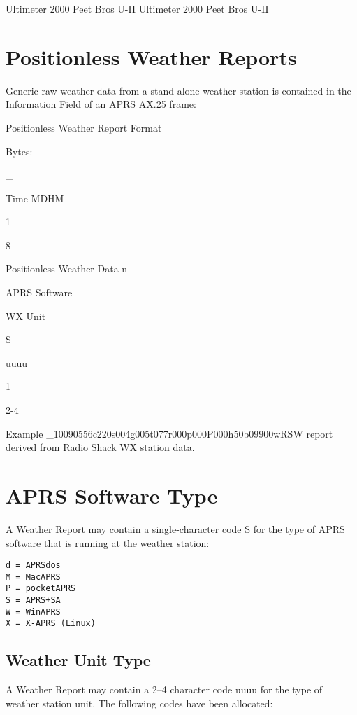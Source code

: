 Ultimeter 2000
Peet Bros U-II
Ultimeter 2000
Peet Bros U-II


\section{Positionless Weather Reports}

Generic raw weather data from a stand-alone weather station is contained in
the Information Field of an APRS AX.25 frame:

Positionless Weather Report Format

Bytes:

_

Time
MDHM

1

8

Positionless Weather
Data
n

APRS
Software

WX
Unit

S

uuuu

1

2-4

Example
_10090556c220s004g005t077r000p000P000h50b09900wRSW
report derived from Radio Shack WX station data.

\section {APRS Software Type}

A Weather Report may contain a single-character code S for the type of
APRS software that is running at the weather station:


\begin{verbatim}
d = APRSdos
M = MacAPRS
P = pocketAPRS
S = APRS+SA
W = WinAPRS
X = X-APRS (Linux)
\end{verbatim}

\subsection {Weather Unit Type}

A Weather Report may contain a 2–4 character code uuuu for the type of
weather station unit. The following codes have been allocated:

